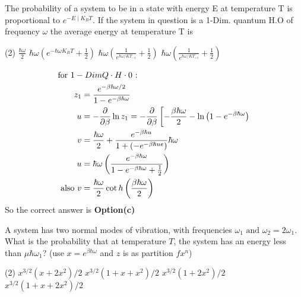\begin{exercise}
	The probability of a system to be in a state with energy E at temperature T is proportional to $e^{-E \mid K_{B} T}$. If the system in question is a 1-Dim. quantum H.O of frequency $\omega$ the average energy at temperature T is
	 \begin{tasks}(2)
		\task[\textbf{a.}]$\frac{\hbar\omega}{2}$
		\task[\textbf{b.}]$\hbar \omega\left(e^{-\hbar \omega K_{B} T}+\frac{1}{2}\right)$
		\task[\textbf{c.}]$\hbar \omega\left(\frac{1}{e^{\hbar\omega/KT_{-1}}}+\frac{1}{2}\right)$
		\task[\textbf{d.}] $\hbar \omega\left(\frac{1}{e^{\hbar\omega/KT_{+1}}}+\frac{1}{2}\right)$
	\end{tasks}
\end{exercise}
\begin{answer}
	\begin{align*}
	\intertext{for $1-Dim Q \cdot H \cdot 0$ :}
	z_{1}&=\frac{e^{-\beta \hbar \omega / 2}}{1-e^{-\beta \hbar \omega}}\\
	u&=-\frac{\partial}{\partial \beta} \ln z_{1}=-\frac{\partial}{\partial \beta}\left[-\frac{\beta \hbar \omega}{2}-\ln \left(1-e^{-\beta \hbar \omega}\right)\right.\\
	v&=\frac{\hbar \omega}{2}+\frac{e^{-\beta \hbar u}}{1+\left(-e^{-\beta \hbar u e}\right)} \hbar \omega\\
	u&=\hbar \omega\left(\frac{e^{-\beta \hbar \omega}}{1-e^{-\beta \hbar \omega}+\frac{1}{2}}\right)\\
	\text { also } v&=\frac{\hbar \omega}{2} \cot h\left(\frac{\beta \hbar \omega}{2}\right)
	\end{align*}
	So the correct answer is \textbf{Option(c)}
\end{answer}
\begin{exercise}
	 A system has two normal modes of vibration, with frequencies $\omega_{1}\text{ and }\omega_{2}=2\omega_{1}$. What is the probability that at temperature $T$, the system has an energy less than $\mu\hbar\omega_{1}$? (use $x=e^{\beta \hbar \omega}$ and $z$ is as partition $fx^n$)
	 \begin{tasks}(2)
		\task[\textbf{a.}]$x^{3 / 2}\left(x+2 x^{2}\right) / 2$
		\task[\textbf{b.}]$x^{3 / 2}\left(1+x+x^{2}\right) / 2$
		\task[\textbf{c.}] $x^{3 / 2}\left(1+2 x^{2}\right) / 2$
		\task[\textbf{d.}] $x^{3 / 2}\left(1+x+2 x^{2}\right) / 2$
	\end{tasks}
\end{exercise}

